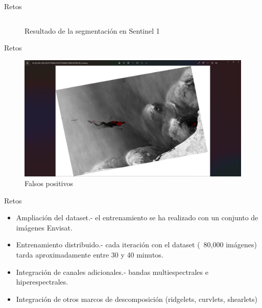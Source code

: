 \begin{frame}{Retos}
\begin{figure}
\begin{tabular}{cc}
    \end{tabular}
    \caption{Resultado de la segmentación en Sentinel 1}
    \label{fig:my_label}
\end{figure}
\end{frame}

\begin{frame}{Retos}
    \begin{figure}
        \centering
        \includegraphics[scale=0.3]{img/section_07/segmentacion_03.jpg}
        \caption{Falsos positivos}
        \label{fig:enter-label}
    \end{figure}
\end{frame}

\begin{frame}{Retos}
    \begin{itemize}
        \item Ampliación del dataset.- el entrenamiento se ha realizado con un conjunto de imágenes Envisat.
        
        \item Entrenamiento distribuido.- cada iteración con el dataset (~80,000 imágenes) tarda aproximadamente entre 30 y 40 minutos.
        
        \item Integración de canales adicionales.- bandas multiespectrales e hiperespectrales.        
        \item Integración de otros marcos de descomposición (ridgelets, curvlets, shearlets)
    \end{itemize}
\end{frame}
